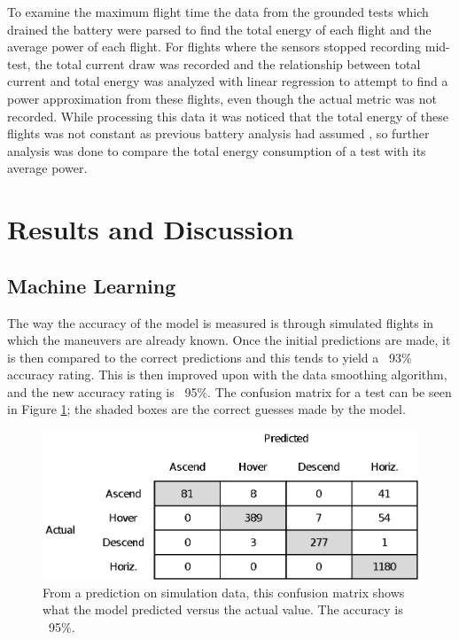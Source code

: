 \documentclass{article}
\begin{document}
To examine the maximum flight time the data from the grounded tests which drained the battery were parsed to find the total energy of each flight and the average power of each flight. For flights where the  sensors stopped recording mid-test, the total current draw was recorded and the relationship between total current and total energy was analyzed with linear regression to attempt to find a power approximation from these flights, even though the actual metric was not recorded. While processing this data it was noticed that the total energy of these flights was not constant as previous battery analysis had assumed \cite{Prasetia}, so further analysis was done to compare the total energy consumption of a test with its average power.


\section{Results and Discussion}


\subsection{Machine Learning}
The way the accuracy of the model is measured is through simulated flights in which the maneuvers are already known. Once the initial predictions are made, it is then compared to the correct predictions and this tends to yield a ~93\% accuracy rating. This is then improved upon with the data smoothing algorithm, and the new accuracy rating is ~95\%. The confusion matrix for a test can be seen in Figure \ref{fig:matrix}; the shaded boxes are the correct guesses made by the model. 

\begin{figure}[!h]
	\centering
	\includegraphics{images/matrix}
	\caption{From a prediction on simulation data, this confusion matrix shows what the model predicted versus the actual value. The accuracy is ~95\%.}
	\label{fig:matrix}
\end{figure}
\end{document}
